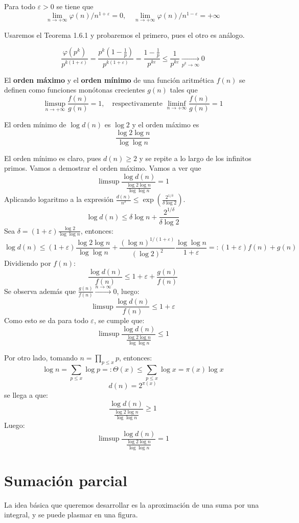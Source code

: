 \documentclass[TAN.tex]{subfiles}
\begin{document}
\begin{prop}
Para todo $\varepsilon > 0$ se tiene que
\[ \lim_{n \to +∞} φ(n)/n^{1+\varepsilon} =0, \quad \lim_{n \to +∞} φ(n)/n^{1-\varepsilon} = +∞ \]
\end{prop}
\begin{dem}
Usaremos el Teorema 1.6.1 y probaremos el primero, pues el otro es análogo.

$$
\frac{\varphi(p^k)}{p^{k(1+\varepsilon)}} = \frac{p^k(1-\frac{1}{p})}{p^{k(1+\varepsilon)}} = \frac{1-\frac{1}{p}}{p^{k\varepsilon}} \leq \frac{1}{p^{k\varepsilon}} \underset{p^k\to \infty}{\longrightarrow} 0
$$
\end{dem}
El \textbf{orden máximo} y el \textbf{orden mínimo} de una función aritmética $f(n)$ se definen como funciones monótonas crecientes $g(n)$ tales que
\[ \limsup_{n\to+∞} \frac{f(n)}{g(n)} = 1, \quad \text{respectivamente }\liminf_{n\to+∞}\frac{f(n)}{g(n)} = 1 \]
\begin{prop}
El orden mínimo de $\log d(n)$ es $\log 2$ y el orden máximo es
\[ \frac{\log 2 \log n}{\log \log n} \]
\end{prop}
\begin{dem}
El orden mínimo es claro, pues $d(n)\geq 2$ y se repite a lo largo de los infinitos primos. Vamos a demostrar el orden máximo. Vamos a ver que
\[ \limsup \frac{\log d(n)}{\frac{\log 2 \log n}{\log \log n}} = 1\]
Aplicando logaritmo a la expresión $\frac{d(n)}{n^δ} ≤ \exp\left(\frac{2^{1/δ}}{δ\log 2}\right)$.
\[
	\log d(n) ≤ δ\log n + \frac{2^{1/δ}}{δ\log 2}
\]
Sea $δ = (1+\varepsilon)\frac{\log 2}{\log \log n}$, entonces:
\[
	\log d(n) ≤ (1+\varepsilon) \frac{\log 2 \log n}{\log \log n} + \frac{(\log n)^{1/(1+\varepsilon)}}{(\log 2)^2} \frac{\log \log n}{1+\varepsilon} =: (1+\varepsilon)f(n) + g(n)
\]
Dividiendo por $f(n)$:
\[ 
	\frac{\log d(n)}{f(n)} ≤ 1 + \varepsilon + \frac{g(n)}{f(n)}
\]
Se observa además que $\frac{g(n)}{f(n)} \xrightarrow{n \to ∞} 0$, luego:
\[ 
	\limsup \frac{\log d(n)}{f(n)} ≤ 1+\varepsilon
\]
Como esto se da para todo $\varepsilon$, se cumple que:
\[ 
	\limsup \frac{\log d(n)}{\frac{\log 2 \log n}{\log \log n}} ≤ 1
\]

Por otro lado, tomando $n = \prod_{p≤x} p$, entonces:
\[ \log n = \sum_{p≤x} \log p =: Θ(x) ≤ \sum_{p≤x} \log x = π(x) \log x \]
\[ d(n) = 2^{π(x)} \]
se llega a que:
\[ \frac{\log d(n)}{\frac{\log 2 \log n}{\log \log n}} ≥ 1 \]
Luego:
\[
	\limsup \frac{\log d(n)}{\frac{\log 2 \log n}{\log \log n}} = 1 
\]
\end{dem}

\section{Sumación parcial}
La idea básica que queremos desarrollar es la aproximación de una suma por una integral, y se puede plasmar en una figura.
\end{document}
